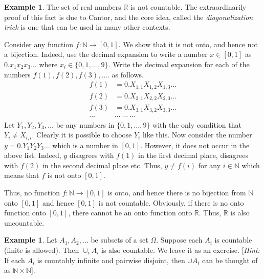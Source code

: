 \documentclass[preprint,  11pt]{amsart}
\theoremstyle{plain} %
\theoremstyle{definition} %
\newtheorem{example}[theorem]{Example}
\begin{document}
{\begin{example} The set of real numbers $\mathbb{R}$ is not countable. The extraordinarily proof of this fact is due to Cantor, and the core idea, called the {\em diagonalization trick} is one that can be used in many other contexts.

Consider any function $f:\mathbb{N} \rightarrow [0,1]$. We show that it is not onto, and hence not a bijection. Indeed, use the decimal expansion to write a number $x\in [0,1]$ as $0.x_{1}x_{2}x_{3}\ldots$ where $x_{i}\in \{0,1,\ldots ,9\}$. Write the decimal expansion for each of the numbers $f(1),f(2),f(3),.\ldots$ as follows.
\begin{align*}
f(1)&=0.X_{1,1}X_{1,2}X_{1,3}\ldots \\
f(2)&=0.X_{2,1}X_{2,2}X_{2,3}\ldots \\
f(3)&=0.X_{3,1}X_{3,2}X_{3,3}\ldots \\
\cdots & \cdots \; \cdots \; \cdots
\end{align*}
Let $Y_{1},Y_{2},Y_{3},\ldots$ be any numbers in $\{0,1,\ldots ,9\}$ with the only condition that $Y_{i}\not= X_{i,i}$. Clearly it is possible to choose $Y_{i}$ like this. Now consider the number $y=0.Y_{1}Y_{2}Y_{3}\ldots$ which is a number in $[0,1]$. However, it does not occur in the above list. Indeed, $y$ disagrees with $f(1)$ in the first decimal place, disagrees with $f(2)$ in the second decimal place etc. Thus, $y\not= f(i)$ for any $i\in \mathbb{N}$ which means that $f$ is not onto $[0,1]$.

Thus, no function $f:\mathbb{N}\rightarrow [0,1]$ is onto, and hence there is no bijection from $\mathbb{N}$ onto $[0,1]$ and hence $[0,1]$ is not countable. Obviously, if there is no onto function onto $[0,1]$, there cannot be an onto function onto $\mathbb{R}$. Thus, $\mathbb{R}$ is also uncountable.
\end{example}

\begin{example} Let $A_{1},A_{2},\ldots $ be subsets of a set $\Omega$. Suppose each $A_{i}$ is countable (finite is allowed). Then $\cup_{i}A_{i}$ is also countable. We leave it as an exercise. [{\em Hint:} If each $A_{i}$ is countably infinite and pairwise disjoint, then $\cup A_{i}$ can be thought of as $\mathbb{N}\times \mathbb{N}$].
\end{example}

}
\end{document}
